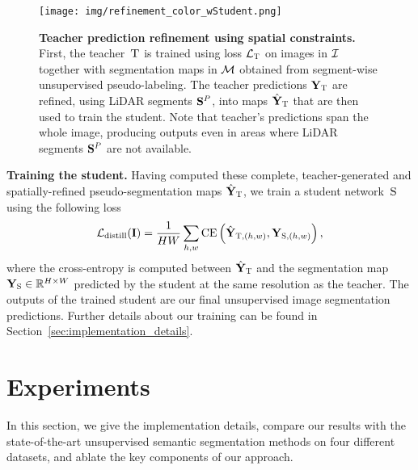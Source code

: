 \documentclass[runningheads]{llncs}
\newcommand{\teacher}{\textsc{T}} \newcommand{\student}{\textsc{S}} \newcommand{\das}{D\&S\xspace}
\newcommand{\paragraphcustom}[1]{\smallskip\noindent\textbf{#1}}
\begin{document}
\begin{figure}[t]
    \centering
    \texttt{[image: img/refinement\_color\_wStudent.png]}
    \vspace{-20pt}
    \caption{
    \textbf{Teacher prediction refinement using spatial constraints.}
    First, the teacher~$\teacher $ is trained using loss $\mathcal{L}_{\teacher} $ on images in $\mathcal{I}$ together with segmentation maps in $\mathcal{M}$ obtained from segment-wise unsupervised pseudo-labeling. The teacher predictions $\mathrm{\vY}_{\teacher }$ are refined, using LiDAR segments $\mathbf{S}^{P}$, into maps $\mathrm{\hat{\vY}}_{\teacher }$ that are then used to train the student.  
    Note that teacher's  predictions span the whole image, producing outputs even in areas where LiDAR segments $\mathbf{S}^P$ are not available.
    }
    \label{fig:refinement}
    \vspace{-3ex}
\end{figure}

\paragraphcustom{Training the student.} Having computed these complete, teacher-generated and spatially-refined pseudo-segmentation maps $\mathrm{\hat{\vY}}_{\teacher }$, we  train a 
student network~$\student$ using the following loss
\begin{equation}
     \mathcal{L}_{\text{distill}}(\vI) = \frac{1}{H W} 
     \sum_{h,w}
        \mathrm{CE} \left( 
        \mathrm{\hat{\vY}}_{\teacher,(h,w) }, \mathrm{\vY}_{\student,(h,w) } 
        \right)
    , 
\label{eq:disti_stud}
\end{equation}
where the cross-entropy is computed between 
$\mathrm{\hat{\vY}}_{\teacher }$ and 
the segmentation map~$\mathrm{\vY}_{\student } \in \real^{H\times W}$ predicted by the student at the same resolution as the teacher. The outputs of the trained student are our final unsupervised image segmentation predictions. Further details about our training can be found in Section~\ref{sec:implementation_details}. 
 
\section{Experiments}
\label{sec:experiments}
In this section, we give the implementation details, compare our results with the state-of-the-art unsupervised semantic segmentation methods on four different datasets, and ablate the key components of our approach.
\end{document}
